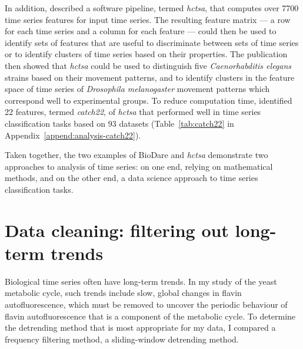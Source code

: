 In addition, \textcite{fulcherHctsaComputationalFramework2017} described a software pipeline, termed \textit{hctsa}, that computes over 7700 time series features for input time series.
The resulting feature matrix --- a row for each time series and a column for each feature --- could then be used to identify sets of features that are useful to discriminate between sets of time series or to identify clusters of time series based on their properties.
The publication then showed that \textit{hctsa} could be used to distinguish five \textit{Caenorhabditis elegans} strains based on their movement patterns, and to identify clusters in the feature space of time series of \textit{Drosophila melanogaster} movement patterns which correspond well to experimental groups.
To reduce computation time, \textcite{lubbaCatch22CAnonicalTimeseries2019} identified 22 features, termed \textit{catch22}, of \textit{hctsa} that performed well in time series classification tasks based on 93 datasets (Table~\ref{tab:catch22} in Appendix~\ref{append:analysis-catch22}).

Taken together, the two examples of BioDare and \textit{hctsa} demonstrate two approaches to analysis of time series: on one end, relying on mathematical methods, and on the other end, a data science approach to time series classification tasks.


\section{Data cleaning: filtering out long-term trends}
\label{sec:analysis-cleaning}

Biological time series often have long-term trends.
In my study of the yeast metabolic cycle, such trends include slow, global changes in flavin autofluorescence, which must be removed to uncover the periodic behaviour of flavin autofluorescence that is a component of the metabolic cycle.
To determine the detrending method that is most appropriate for my data, I compared a frequency filtering method, a sliding-window detrending method.



